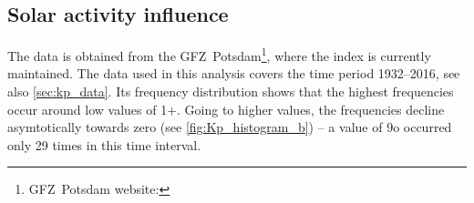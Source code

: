 \subsection{Solar activity influence}
The \Kp{} data is obtained from the GFZ~Potsdam\footnote{GFZ~Potsdam website: }, where the index is currently maintained. The data used in this analysis covers the time period 1932--2016, see also \ref{sec:kp_data}. Its frequency distribution shows that the highest frequencies occur around low \Kp{} values of 1+. Going to higher \Kp{} values, the frequencies decline asymtotically towards zero (see \autoref{fig:Kp_histogram_b}) -- a \Kp{} value of 9o occurred only 29 times in this time interval.\\
\begin{figure}[htb]
	\begin{floatrow}
\end{floatrow}
\end{figure}
